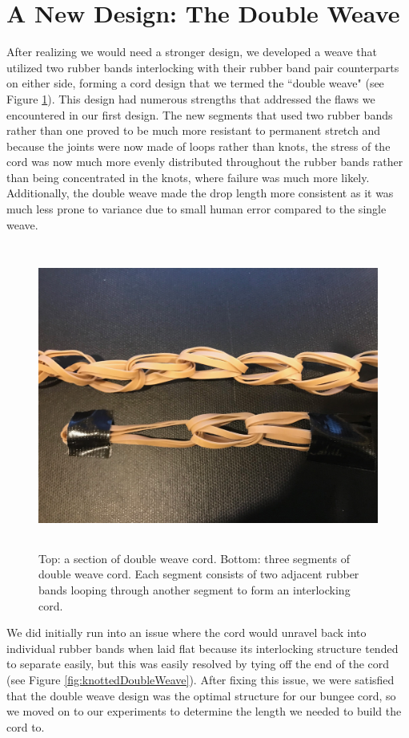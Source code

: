\documentclass[12pt]{article}
\begin{document}
\section{A New Design: The Double Weave}

After realizing we would need a stronger design, we developed a weave that utilized two rubber bands interlocking with their rubber band pair counterparts on either side, forming a cord design that we termed the ``double weave" (see Figure \ref{fig:doubleWeave}). This design had numerous strengths that addressed the flaws we encountered in our first design. The new segments that used two rubber bands rather than one proved to be much more resistant to permanent stretch and because the joints were now made of loops rather than knots, the stress of the cord was now much more evenly distributed throughout the rubber bands rather than being concentrated in the knots, where failure was much more likely. Additionally, the double weave made the drop length more consistent as it was much less prone to variance due to small human error compared to the single weave.
\newline

\begin{figure}
    \centering
    \includegraphics[width=16cm,height=10cm]{doubleweave}
    \caption{Top: a section of double weave cord. Bottom: three segments of double weave cord. Each segment consists of two adjacent rubber bands looping through another segment to form an interlocking cord.}
    \label{fig:doubleWeave}
\end{figure}

We did initially run into an issue where the cord would unravel back into individual rubber bands when laid flat because its interlocking structure tended to separate easily, but this was easily resolved by tying off the end of the cord (see Figure \ref{fig:knottedDoubleWeave}). After fixing this issue, we were satisfied that the double weave design was the optimal structure for our bungee cord, so we moved on to our experiments to determine the length we needed to build the cord to.
\end{document}
